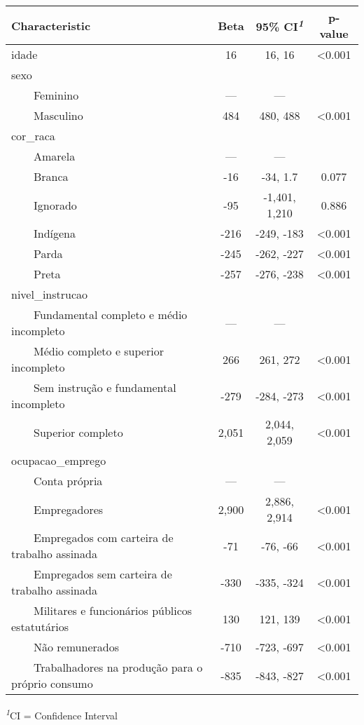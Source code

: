 \begingroup
\fontsize{12.0pt}{14.4pt}\selectfont
\setlength{\LTpost}{0mm}
\begin{longtable}{lccc}
\toprule
\textbf{Characteristic} & \textbf{Beta} & \textbf{95\% CI}\textsuperscript{\textit{1}} & \textbf{p-value} \\ 
\midrule\addlinespace[2.5pt]
idade & 16 & 16, 16 & <0.001 \\ 
sexo &  &  &  \\ 
    Feminino & — & — &  \\ 
    Masculino & 484 & 480, 488 & <0.001 \\ 
cor\_raca &  &  &  \\ 
    Amarela & — & — &  \\ 
    Branca & -16 & -34, 1.7 & 0.077 \\ 
    Ignorado & -95 & -1,401, 1,210 & 0.886 \\ 
    Indígena & -216 & -249, -183 & <0.001 \\ 
    Parda & -245 & -262, -227 & <0.001 \\ 
    Preta & -257 & -276, -238 & <0.001 \\ 
nivel\_instrucao &  &  &  \\ 
    Fundamental completo e médio incompleto & — & — &  \\ 
    Médio completo e superior incompleto & 266 & 261, 272 & <0.001 \\ 
    Sem instrução e fundamental incompleto & -279 & -284, -273 & <0.001 \\ 
    Superior completo & 2,051 & 2,044, 2,059 & <0.001 \\ 
ocupacao\_emprego &  &  &  \\ 
    Conta própria & — & — &  \\ 
    Empregadores & 2,900 & 2,886, 2,914 & <0.001 \\ 
    Empregados com carteira de trabalho assinada & -71 & -76, -66 & <0.001 \\ 
    Empregados sem carteira de trabalho assinada & -330 & -335, -324 & <0.001 \\ 
    Militares e funcionários públicos estatutários & 130 & 121, 139 & <0.001 \\ 
    Não remunerados & -710 & -723, -697 & <0.001 \\ 
    Trabalhadores na produção para o próprio consumo & -835 & -843, -827 & <0.001 \\ 
\bottomrule
\end{longtable}
\begin{minipage}{\linewidth}
\textsuperscript{\textit{1}}CI = Confidence Interval\\
\end{minipage}
\endgroup

